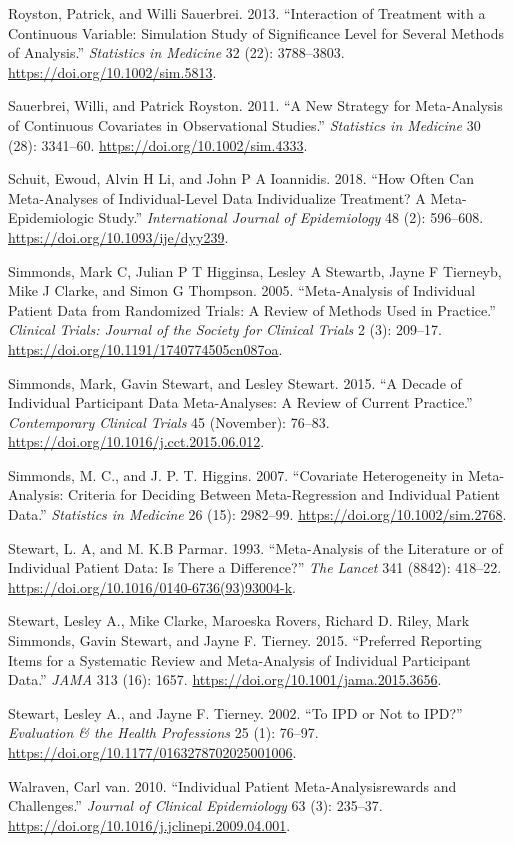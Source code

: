 \documentclass[]{article}
\begin{document}
\leavevmode\hypertarget{ref-royston_interaction_2013}{}%
Royston, Patrick, and Willi Sauerbrei. 2013. ``Interaction of Treatment
with a Continuous Variable: Simulation Study of Significance Level for
Several Methods of Analysis.'' \emph{Statistics in Medicine} 32 (22):
3788--3803. \url{https://doi.org/10.1002/sim.5813}.

\leavevmode\hypertarget{ref-Sauerbrei_2011}{}%
Sauerbrei, Willi, and Patrick Royston. 2011. ``A New Strategy for
Meta-Analysis of Continuous Covariates in Observational Studies.''
\emph{Statistics in Medicine} 30 (28): 3341--60.
\url{https://doi.org/10.1002/sim.4333}.

\leavevmode\hypertarget{ref-Schuit_2018}{}%
Schuit, Ewoud, Alvin H Li, and John P A Ioannidis. 2018. ``How Often Can
Meta-Analyses of Individual-Level Data Individualize Treatment? A
Meta-Epidemiologic Study.'' \emph{International Journal of Epidemiology}
48 (2): 596--608. \url{https://doi.org/10.1093/ije/dyy239}.

\leavevmode\hypertarget{ref-Simmonds_2005}{}%
Simmonds, Mark C, Julian P T Higginsa, Lesley A Stewartb, Jayne F
Tierneyb, Mike J Clarke, and Simon G Thompson. 2005. ``Meta-Analysis of
Individual Patient Data from Randomized Trials: A Review of Methods Used
in Practice.'' \emph{Clinical Trials: Journal of the Society for
Clinical Trials} 2 (3): 209--17.
\url{https://doi.org/10.1191/1740774505cn087oa}.

\leavevmode\hypertarget{ref-Simmonds_2015}{}%
Simmonds, Mark, Gavin Stewart, and Lesley Stewart. 2015. ``A Decade of
Individual Participant Data Meta-Analyses: A Review of Current
Practice.'' \emph{Contemporary Clinical Trials} 45 (November): 76--83.
\url{https://doi.org/10.1016/j.cct.2015.06.012}.

\leavevmode\hypertarget{ref-Simmonds_2007}{}%
Simmonds, M. C., and J. P. T. Higgins. 2007. ``Covariate Heterogeneity
in Meta-Analysis: Criteria for Deciding Between Meta-Regression and
Individual Patient Data.'' \emph{Statistics in Medicine} 26 (15):
2982--99. \url{https://doi.org/10.1002/sim.2768}.

\leavevmode\hypertarget{ref-Stewart_1993}{}%
Stewart, L. A, and M. K.B Parmar. 1993. ``Meta-Analysis of the
Literature or of Individual Patient Data: Is There a Difference?''
\emph{The Lancet} 341 (8842): 418--22.
\url{https://doi.org/10.1016/0140-6736(93)93004-k}.

\leavevmode\hypertarget{ref-Stewart_2015}{}%
Stewart, Lesley A., Mike Clarke, Maroeska Rovers, Richard D. Riley, Mark
Simmonds, Gavin Stewart, and Jayne F. Tierney. 2015. ``Preferred
Reporting Items for a Systematic Review and Meta-Analysis of Individual
Participant Data.'' \emph{JAMA} 313 (16): 1657.
\url{https://doi.org/10.1001/jama.2015.3656}.

\leavevmode\hypertarget{ref-Stewart_2002}{}%
Stewart, Lesley A., and Jayne F. Tierney. 2002. ``To IPD or Not to
IPD?'' \emph{Evaluation \& the Health Professions} 25 (1): 76--97.
\url{https://doi.org/10.1177/0163278702025001006}.

\leavevmode\hypertarget{ref-van_Walraven_2010}{}%
Walraven, Carl van. 2010. ``Individual Patient Meta-Analysisrewards and
Challenges.'' \emph{Journal of Clinical Epidemiology} 63 (3): 235--37.
\url{https://doi.org/10.1016/j.jclinepi.2009.04.001}.
\end{document}
